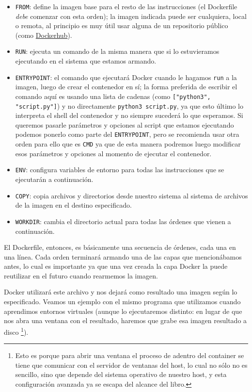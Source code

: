 \begin{itemize}
 \item \verb|FROM|: define la imagen base para el resto de las instrucciones (el Dockerfile \textit{debe} comenzar con esta orden); la imagen indicada puede ser cualquiera, local o remota, al principio es muy útil usar alguna de un repositorio público (como \href{https://hub.docker.com/search?q=&type=image}{Dockerhub}).
 \item \verb|RUN|: ejecuta un comando de la misma manera que si lo estuvieramos ejecutando en el sistema que estamos armando.
 \item \verb|ENTRYPOINT|: el comando que ejecutará Docker cuando le hagamos \verb|run| a la imagen, luego de crear el contenedor en sí; la forma preferida de escribir el comando aquí es usando una lista de cadenas (como \texttt{["python3", "script.py"]}) y no directamente \texttt{python3 script.py}, ya que esto último lo interpreta el shell del contenedor y no siempre sucederá lo que esperamos. Si queremos pasarle parámetros y opciones al script que estamos ejecutando podemos ponerlo como parte del \verb|ENTRYPOINT|, pero se recomienda usar otra orden para ello que es \verb|CMD| ya que de esta manera podremos luego modificar esos parámetros y opciones al momento de ejecutar el contenedor.
 \item \verb|ENV|: configura variables de entorno para todas las instrucciones que se ejecutarán a continuación.
 \item \verb|COPY|: copia archivos y directorios desde nuestro sistema al sistema de archivos de la imagen en el destino especificado.
 \item \verb|WORKDIR|: cambia el directorio actual para todas las órdenes que vienen a continuación.
\end{itemize}

El Dockerfile, entonces, es básicamente una secuencia de órdenes, cada una en una línea. Cada orden terminará armando una de las capas que mencionábamos antes, lo cual es importante ya que una vez creada la capa Docker la puede reutilizar en el futuro cuando rearmemos la imagen.

Docker utilizará este archivo y nos dejará como resultado una imagen según lo especificado. Veamos un ejemplo con el mismo programa que utilizamos cuando aprendimos entornos virtuales (aunque lo ejecutaremos distinto: en lugar de que nos abra una ventana con el resultado, haremos que grabe esa imagen resultado a disco \footnote{Esto es porque para abrir una ventana el proceso de adentro del container se tiene que comunicar con el servidor de ventanas del host, lo cual no sólo no es sencillo, sino que depende del sistema operativo de nuestro host, y esta configuración avanzada ya se escapa del alcance del libro.}).

